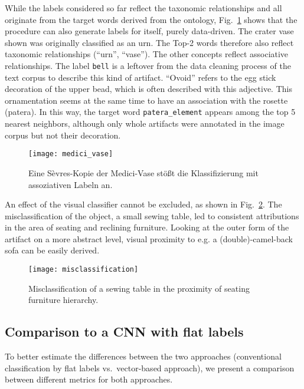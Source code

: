 While the labels considered so far reflect the taxonomic relationships and all originate from the target words derived from the ontology, Fig.~\ref{fig:medici_vase} shows that the procedure can also generate labels for itself, purely data-driven. The crater vase shown was originally classified as an urn. The Top-2 words therefore also reflect taxonomic relationships (\enquote{urn}, \enquote{vase}). The other concepts reflect associative relationships. The label \texttt{bell} is a leftover from the data cleaning process of the text corpus to describe this kind of artifact. \enquote{Ovoid} refers to the egg stick decoration of the upper bead, which is often described with this adjective. This ornamentation seems at the same time to have an association with the rosette (patera). In this way, the target word \texttt{patera\_element} appears among the top 5 nearest neighbors, although only whole artifacts were annotated in the image corpus but not their decoration.


\begin{figure}
    \centering
    \texttt{[image: medici\_vase]}
    \caption{Eine Sèvres-Kopie der Medici-Vase stößt die Klassifizierung mit assoziativen Labeln an.}
    \label{fig:medici_vase}
\end{figure}


An effect of the visual classifier cannot be excluded, as shown in Fig.~\ref{fig:misclassification}. The misclassification of the object, a small sewing table, led to consistent attributions in the area of seating and reclining furniture. Looking at the outer form of the artifact on a more abstract level, visual proximity to e.g. a (double)-camel-back sofa can be easily derived.


\begin{figure}
    \centering
    \texttt{[image: misclassification]}
    \caption{Misclassification of a sewing table in the proximity of seating furniture hierarchy.}
    \label{fig:misclassification}
\end{figure}


\subsection{Comparison to a CNN with flat labels}

To better estimate the differences between the two approaches (conventional classification by flat labels vs.~vector-based approach), we present a comparison between different metrics for both approaches.

